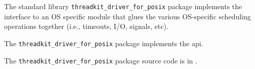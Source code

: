 
The standard library {\tt threadkit\_driver\_for\_posix} package implements 
the interface to an OS specific module that glues the various 
OS-specific scheduling operations together (i.e., timeouts, I/O, signals, etc).

The {\tt threadkit\_driver\_for\_posix} package implements the  api.

The {\tt threadkit\_driver\_for\_posix} package source code is in .
